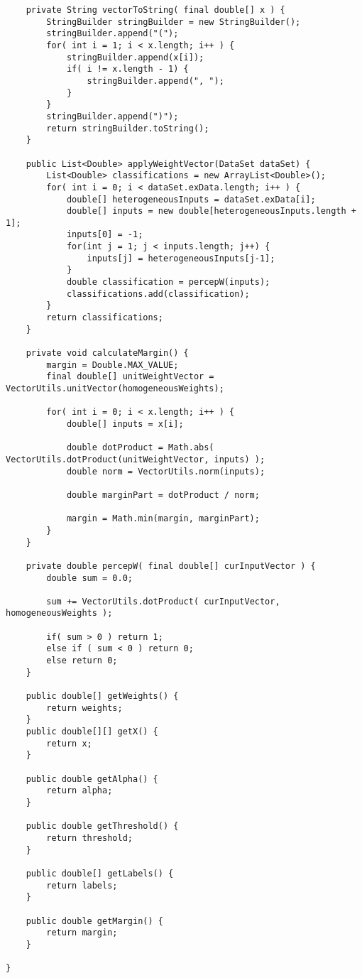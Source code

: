 \begin{lstlisting}
	private String vectorToString( final double[] x ) {
		StringBuilder stringBuilder = new StringBuilder();
		stringBuilder.append("(");
		for( int i = 1; i < x.length; i++ ) {
			stringBuilder.append(x[i]);
			if( i != x.length - 1) {
				stringBuilder.append(", ");
			}
		}
		stringBuilder.append(")");
		return stringBuilder.toString();
	}
	
	public List<Double> applyWeightVector(DataSet dataSet) {
		List<Double> classifications = new ArrayList<Double>();
		for( int i = 0; i < dataSet.exData.length; i++ ) {
			double[] heterogeneousInputs = dataSet.exData[i];
			double[] inputs = new double[heterogeneousInputs.length + 1];
			inputs[0] = -1;
			for(int j = 1; j < inputs.length; j++) {
				inputs[j] = heterogeneousInputs[j-1];
			}
			double classification = percepW(inputs);
			classifications.add(classification);
		}
		return classifications;
	}
	
	private void calculateMargin() {
		margin = Double.MAX_VALUE;
		final double[] unitWeightVector = VectorUtils.unitVector(homogeneousWeights);
		
		for( int i = 0; i < x.length; i++ ) {
			double[] inputs = x[i];
			
			double dotProduct = Math.abs( VectorUtils.dotProduct(unitWeightVector, inputs) );
			double norm = VectorUtils.norm(inputs);
			
			double marginPart = dotProduct / norm;
			
			margin = Math.min(margin, marginPart);
		}
	}
	
	private double percepW( final double[] curInputVector ) {
		double sum = 0.0;
		
		sum += VectorUtils.dotProduct( curInputVector, homogeneousWeights );
		
		if( sum > 0 ) return 1;
		else if ( sum < 0 ) return 0;
		else return 0;
	}

	public double[] getWeights() {
		return weights;
	}
	public double[][] getX() {
		return x;
	}

	public double getAlpha() {
		return alpha;
	}

	public double getThreshold() {
		return threshold;
	}

	public double[] getLabels() {
		return labels;
	}

	public double getMargin() {
		return margin;
	}

}
\end{lstlisting}


